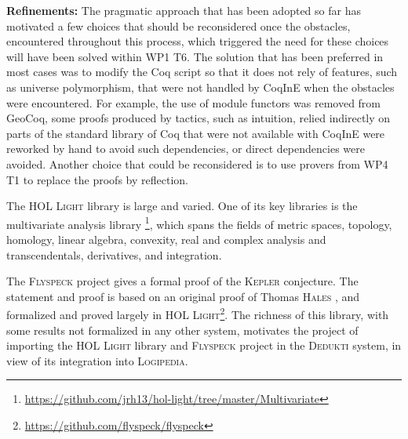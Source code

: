\begin{workpackage}[id=libraries,wphases=0-48,type=RTD,
  short=Libraries,%
  title=Libraries,
  lead=Inr,
  InrRM=10,
  TumRM=39]
\begin{tasklist}
\begin{task}[id=geocoq,title=The GeoCoq library]
\textbf{Refinements:}
The pragmatic approach that has been adopted so far has motivated a few choices that should be reconsidered once the obstacles, encountered throughout this process, which triggered the need for these choices will have been solved within WP1 T6. The solution that has been preferred in most cases was to modify the Coq script so that it does not rely of features, such as universe polymorphism, that were not handled by CoqInE when the obstacles were encountered. For example, the use of module functors was removed from GeoCoq, some proofs produced by tactics, such as intuition, relied indirectly on parts of the standard library of Coq that were not available with CoqInE were reworked by hand to avoid such dependencies, or direct dependencies were avoided. Another choice that could be reconsidered is to use provers from WP4 T1 to replace the proofs by reflection.
\end{task}

\begin{task}[id=flyspeck,title=The Flyspeck library]
The \textsc{HOL Light} library is large and varied.
One of its key libraries is the multivariate analysis library
\footnote{\url{https://github.com/jrh13/hol-light/tree/master/Multivariate}},
which spans the fields of metric spaces, topology, homology, linear algebra,
convexity, real and complex analysis and transcendentals, derivatives, and
integration.

The \textsc{Flyspeck} project gives a formal proof of the \textsc{Kepler}
conjecture. The statement and proof is based on an original proof of Thomas
\textsc{Hales} \cite{DBLP:journals/corr/HalesABDHHKMMNNNOPRSTTTUVZ15},
and formalized and proved largely in \textsc{HOL Light}\footnote{\url{https://github.com/flyspeck/flyspeck}}.
The richness of this library, with some results not formalized in any
other system, motivates the project of importing the \textsc{HOL Light}
library and \textsc{Flyspeck} project in the \textsc{Dedukti} system, in view
of its integration into \textsc{Logipedia}.


\end{task}
\end{tasklist}
\end{workpackage}
